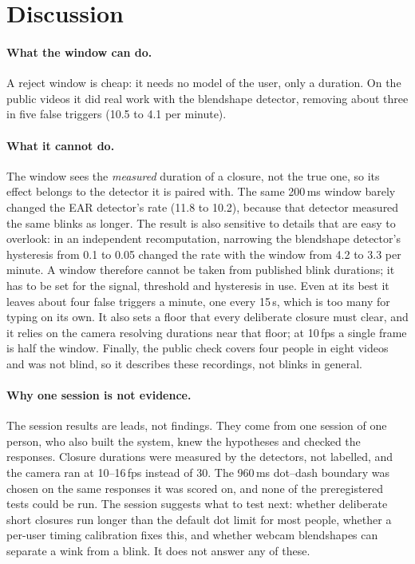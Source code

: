 \section{Discussion}

\paragraph{What the window can do.}
A reject window is cheap: it needs no model of the user, only a duration. On the public videos it did real work
with the blendshape detector, removing about three in five false triggers (10.5 to 4.1 per minute).

\paragraph{What it cannot do.}
The window sees the \emph{measured} duration of a closure, not the true one, so its effect belongs to the detector
it is paired with. The same 200\,ms window barely changed the EAR detector's rate (11.8 to 10.2), because that
detector measured the same blinks as longer. The result is also sensitive to details that are easy to overlook:
in an independent recomputation, narrowing the blendshape detector's hysteresis from 0.1 to 0.05 changed the
rate with the window from 4.2 to 3.3 per minute. A window therefore cannot be taken from published blink
durations; it has to be set for the signal, threshold and hysteresis in use. Even at its best it leaves about
four false triggers a minute, one every 15\,s, which is too many for typing on its own. It also sets a floor that
every deliberate closure must clear, and it relies on the camera resolving durations near that floor; at 10\,fps
a single frame is half the window. Finally, the public check covers four people in eight videos and was not
blind, so it describes these recordings, not blinks in general.

\paragraph{Why one session is not evidence.}
The session results are leads, not findings. They come from one session of one person, who also built the
system, knew the hypotheses and checked the responses. Closure durations were measured by the detectors, not
labelled, and the camera ran at 10--16\,fps instead of 30. The 960\,ms dot--dash boundary was chosen on the same
responses it was scored on, and none of the preregistered tests could be run. The session suggests what to test
next: whether deliberate short closures run longer than the default dot limit for most people, whether a
per-user timing calibration fixes this, and whether webcam blendshapes can separate a wink from a blink. It does
not answer any of these.
